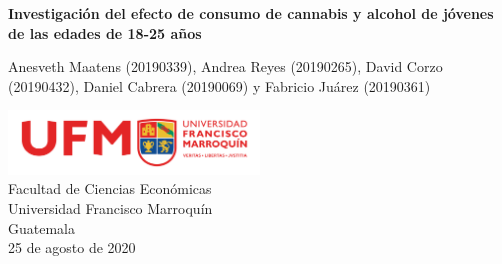 \begin{titlepage}
    \begin{center}
        \vspace*{1cm}
 
        {\Huge\textbf{Investigación del efecto de consumo de cannabis y alcohol de jóvenes de las edades de 18-25 años}}
 
        \vspace{0.5cm}
             
 
        {Anesveth Maatens (20190339), Andrea Reyes (20190265), David Corzo (20190432), Daniel Cabrera (20190069) y Fabricio Juárez (20190361)}
 
        \vfill
             
        \vspace{0.8cm}
        
        
        \includegraphics[width=0.5\textwidth]{ufmlogo.png} \\ 
        Facultad de Ciencias Económicas \\
        Universidad Francisco Marroquín \\
        Guatemala \\
        25 de agosto de 2020
             
    \end{center}
\end{titlepage}
